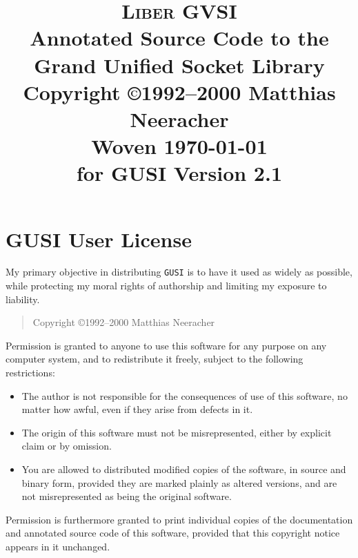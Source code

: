 \documentclass[a4paper,dvips]{book}
\begin{document}
\frontmatter
\title{
\huge \textsc{Liber} \Huge GVSI\\[3ex]
\large
Annotated Source Code to the\\[1ex]
\Large      
Grand Unified Socket Library\\[5ex]
\large
Copyright \copyright 1992--2000 Matthias Neeracher\\[2ex]
Woven \today\\
for GUSI Version 2.1\\
}
\date{}
\maketitle

\newpage
\pagestyle{empty}
%
%
\vspace*{\fill}
\section*{GUSI User License}

My primary objective in distributing \texttt{GUSI} is to have it used as widely as 
possible, while protecting my moral rights of authorship and limiting my 
exposure to liability.

\begin{quotation}
\large Copyright \copyright 1992--2000 Matthias Neeracher
\end{quotation}

Permission is granted to anyone to use this software for any purpose on any
computer system, and to redistribute it freely, subject to the following
restrictions:

\begin{itemize}
\item The author is not responsible for the consequences of use of this software,
  no matter how awful, even if they arise from defects in it.
\item The origin of this software must not be misrepresented, either by explicit
  claim or by omission.
\item You are allowed to distributed modified copies of the software, in source
  and binary form, provided they are marked plainly as altered versions, and 
  are not misrepresented as being the original software.
\end{itemize}

Permission is furthermore granted to print individual copies of the documentation and 
annotated source code of this software, provided that this copyright notice appears in
it unchanged.
\end{document}
